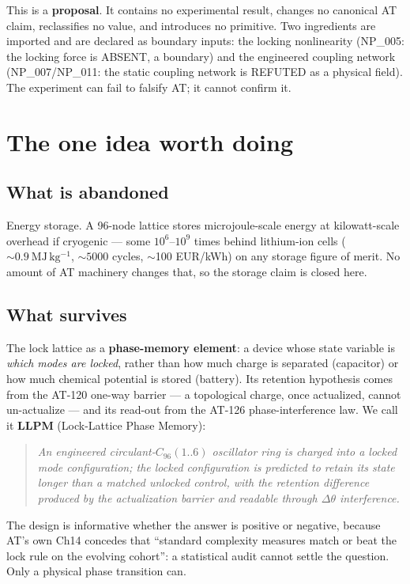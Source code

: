 \documentclass[11pt,a4paper]{article}
\begin{document}
This is a \textbf{proposal}. It contains no experimental result, changes no canonical AT claim,
reclassifies no value, and introduces no primitive. Two ingredients are imported and are declared as
boundary inputs: the locking nonlinearity (NP\_005: the locking force is ABSENT, a boundary) and the
engineered coupling network (NP\_007/NP\_011: the static coupling network is REFUTED as a physical
field). The experiment can fail to falsify AT; it cannot confirm it.

\section{The one idea worth doing}

\subsection{What is abandoned}
Energy storage. A 96-node lattice stores microjoule-scale energy at kilowatt-scale overhead if
cryogenic --- some $10^{6}$--$10^{9}$ times behind lithium-ion cells
($\sim 0.9~\mathrm{MJ\,kg^{-1}}$, $\sim 5000$ cycles, $\sim$100 EUR/kWh) on any storage figure of
merit. No amount of AT machinery changes that, so the storage claim is closed here.

\subsection{What survives}
The lock lattice as a \textbf{phase-memory element}: a device whose state variable is
\emph{which modes are locked}, rather than how much charge is separated (capacitor) or how much
chemical potential is stored (battery). Its retention hypothesis comes from the AT-120 one-way
barrier --- a topological charge, once actualized, cannot un-actualize --- and its read-out from the
AT-126 phase-interference law. We call it \textbf{LLPM} (Lock-Lattice Phase Memory):

\begin{quote}
\emph{An engineered circulant-$C_{96}(1..6)$ oscillator ring is charged into a locked mode
configuration; the locked configuration is predicted to retain its state longer than a matched
unlocked control, with the retention difference produced by the actualization barrier and readable
through $\Delta\theta$ interference.}
\end{quote}

The design is informative whether the answer is positive or negative, because AT's own
Ch14 concedes that ``standard complexity measures match or beat the lock rule on the evolving
cohort'': a statistical audit cannot settle the question. Only a physical phase transition can.
\end{document}
